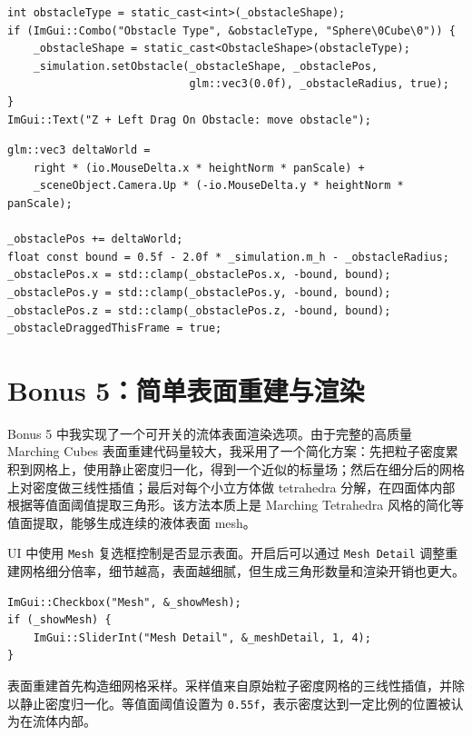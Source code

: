 \documentclass[UTF8,a4paper,11pt]{ctexart}
\begin{document}
\begin{lstlisting}[style=cppstyle,caption={障碍物 UI 与拖动说明}]
int obstacleType = static_cast<int>(_obstacleShape);
if (ImGui::Combo("Obstacle Type", &obstacleType, "Sphere\0Cube\0")) {
    _obstacleShape = static_cast<ObstacleShape>(obstacleType);
    _simulation.setObstacle(_obstacleShape, _obstaclePos,
                            glm::vec3(0.0f), _obstacleRadius, true);
}
ImGui::Text("Z + Left Drag On Obstacle: move obstacle");
\end{lstlisting}

\begin{lstlisting}[style=cppstyle,caption={由鼠标拖动计算障碍物位移}]
glm::vec3 deltaWorld =
    right * (io.MouseDelta.x * heightNorm * panScale) +
    _sceneObject.Camera.Up * (-io.MouseDelta.y * heightNorm * panScale);

_obstaclePos += deltaWorld;
float const bound = 0.5f - 2.0f * _simulation.m_h - _obstacleRadius;
_obstaclePos.x = std::clamp(_obstaclePos.x, -bound, bound);
_obstaclePos.y = std::clamp(_obstaclePos.y, -bound, bound);
_obstaclePos.z = std::clamp(_obstaclePos.z, -bound, bound);
_obstacleDraggedThisFrame = true;
\end{lstlisting}

\section{Bonus 5：简单表面重建与渲染}

Bonus 5 中我实现了一个可开关的流体表面渲染选项。由于完整的高质量 Marching Cubes 表面重建代码量较大，我采用了一个简化方案：先把粒子密度累积到网格上，使用静止密度归一化，得到一个近似的标量场；然后在细分后的网格上对密度做三线性插值；最后对每个小立方体做 tetrahedra 分解，在四面体内部根据等值面阈值提取三角形。该方法本质上是 Marching Tetrahedra 风格的简化等值面提取，能够生成连续的液体表面 mesh。

UI 中使用 \texttt{Mesh} 复选框控制是否显示表面。开启后可以通过 \texttt{Mesh Detail} 调整重建网格细分倍率，细节越高，表面越细腻，但生成三角形数量和渲染开销也更大。

\begin{lstlisting}[style=cppstyle,caption={表面重建 UI}]
ImGui::Checkbox("Mesh", &_showMesh);
if (_showMesh) {
    ImGui::SliderInt("Mesh Detail", &_meshDetail, 1, 4);
}
\end{lstlisting}

表面重建首先构造细网格采样。采样值来自原始粒子密度网格的三线性插值，并除以静止密度归一化。等值面阈值设置为 \texttt{0.55f}，表示密度达到一定比例的位置被认为在流体内部。
\end{document}
